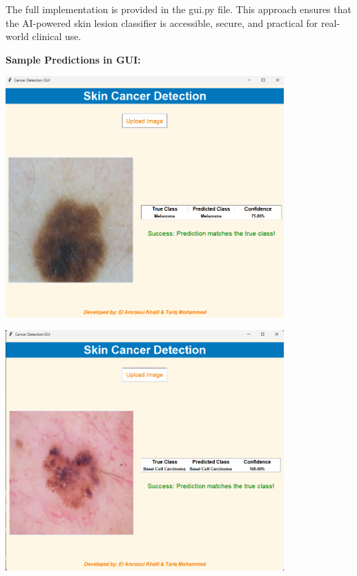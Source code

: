 \documentclass[a4paper,12pt]{report}
\begin{document}
\begin{spacing}{1.5}
    The full implementation is provided in the gui.py file. This approach ensures that the AI-powered skin lesion classifier is accessible, secure, and practical for real-world clinical use.
    
    \newpage
    \textbf{Sample Predictions in GUI:}
    \begin{center}
        \includegraphics[width=0.8\textwidth]{Pics/result1.png}
    \end{center}

    \begin{center}
        \includegraphics[width=0.8\textwidth]{Pics/result2.png}
    \end{center}


\end{spacing}
\end{document}

